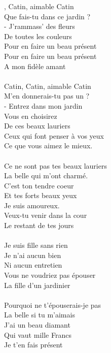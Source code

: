 
, Catin, aimable Catin
\\Que fais-tu dans ce jardin ?
\\- J'rammass' des fleurs
\\De toutes les couleurs
\\Pour en faire un beau présent
\\Pour en faire un beau présent
\\A mon fidèle amant
\\\\Catin, Catin, aimable Catin
\\M'en donnerais-tu pas un ?
\\- Entrez dans mon jardin
\\Vous en choisirez
\\De ces beaux lauriers
\\Ceux qui font penser à vos yeux
\\Ce que vous aimez le mieux.
\\\\Ce ne sont pas tes beaux lauriers
\\La belle qui m'ont charmé.
\\C'est ton tendre coeur
\\Et tes forts beaux yeux
\\Je suis amoureux.
\\Veux-tu venir dans la cour
\\Le restant de tes jours
\\\\Je suis fille sans rien
\\Je n'ai aucun bien
\\Ni aucun entretien
\\Vous ne voudriez pas épouser
\\La fille d'un jardinier
\breakpage
\\\\Pourquoi ne t'épouserais-je pas
\\La belle si tu m'aimais
\\J'ai un beau diamant
\\Qui vaut mille Francs
\\Je t'en fais présent

